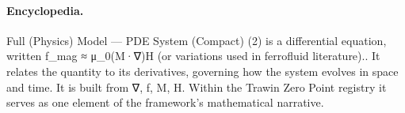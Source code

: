 \paragraph{Encyclopedia.}
Full (Physics) Model — PDE System (Compact) (2) is a differential equation, written f\_mag ≈ μ\_0(M·∇)H (or variations used in ferrofluid literature).. It relates the quantity to its derivatives, governing how the system evolves in space and time. It is built from ∇, f, M, H. Within the Trawin Zero Point registry it serves as one element of the framework's mathematical narrative.
